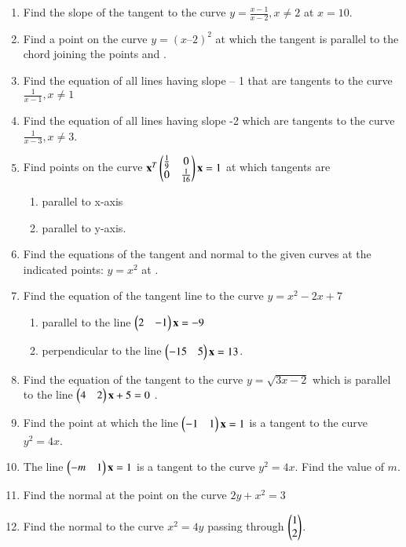 \begin{enumerate}[label=\thesection.\arabic*.,ref=\thesection.\theenumi]
\item Find the slope of the tangent to the curve $y = \frac{x-1}{x-2}, x\ne 2$ at $x = 10$.
\\
\solution

\item Find a point on the curve $y = (x – 2)^2$ at which the tangent is parallel to the chord joining the points  and .
\item Find the equation of all lines having slope – 1 that are tangents to the curve $\frac{1}
{x -1}, x \ne 1$
\item Find the equation of all lines having slope -2 which are tangents to the curve $\frac{1}
{x - 3} , x \ne 3$.
%
\\
\solution 

\item Find points on the curve 
$
\mathbf{x}^T\begin{pmatrix}\frac{1}{9} & 0 \\ 0 & \frac{1}{16}\end{pmatrix}\mathbf{x} = 1
$
%
at which tangents are
\begin{enumerate}
\item  parallel to x-axis
\item  parallel to y-axis.
\end{enumerate}
\item Find the equations of the tangent and normal to the given curves at the indicated points:
$
y = x^2
$
at .
\item Find the equation of the tangent line to the curve $y = x^2-2x+7$
\begin{enumerate}
%
\item  parallel to the line $\begin{pmatrix}2 & -1\end{pmatrix}\mathbf{x}= -9$ 
\item  perpendicular to the line $\begin{pmatrix}-15 & 5\end{pmatrix}\mathbf{x} = 13$. 
\end{enumerate}
\item Find the equation of the tangent to the curve $y = \sqrt{3x - 2}$ which is parallel to the line $\begin{pmatrix}4 & 2\end{pmatrix}\mathbf{x}+ 5 =0$ .
\item Find the point at which the line $\begin{pmatrix}-1 & 1\end{pmatrix}\mathbf{x} =  1$ is a tangent to the curve $y^2 = 4x$.
%
\item The line $\begin{pmatrix}-m & 1\end{pmatrix}\mathbf{x} = 1$ is a tangent to the curve $y^2 = 4x$.  Find the value of $m$.
\item  Find the normal at the point  on the curve $2y + x^2 = 3$ 
\item  Find the normal to the curve $x^2=4y$ passing through $\begin{pmatrix}1\\2\end{pmatrix}$.

\end{enumerate}
